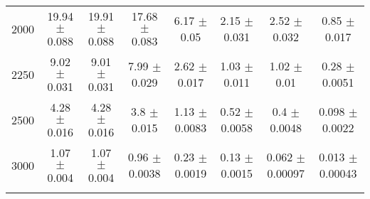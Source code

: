 \begin{footnotesize}
\begin{tabular}{c|c|c|c|c|c|c|c}
2000 & 19.94 $\pm$ 0.088 & 19.91 $\pm$ 0.088 & 17.68 $\pm$ 0.083 & 6.17 $\pm$ 0.05 & 2.15 $\pm$ 0.031 & 2.52 $\pm$ 0.032 & 0.85 $\pm$ 0.017\\ 
2250 & 9.02 $\pm$ 0.031 & 9.01 $\pm$ 0.031 & 7.99 $\pm$ 0.029 & 2.62 $\pm$ 0.017 & 1.03 $\pm$ 0.011 & 1.02 $\pm$ 0.01 & 0.28 $\pm$ 0.0051\\ 
2500 & 4.28 $\pm$ 0.016 & 4.28 $\pm$ 0.016 & 3.8 $\pm$ 0.015 & 1.13 $\pm$ 0.0083 & 0.52 $\pm$ 0.0058 & 0.4 $\pm$ 0.0048 & 0.098 $\pm$ 0.0022\\ 
3000 & 1.07 $\pm$ 0.004 & 1.07 $\pm$ 0.004 & 0.96 $\pm$ 0.0038 & 0.23 $\pm$ 0.0019 & 0.13 $\pm$ 0.0015 & 0.062 $\pm$ 0.00097 & 0.013 $\pm$ 0.00043\\ 
& & & & & & &\\ 
\hline\hline 
\end{tabular} 
\end{footnotesize} 
\newline 
